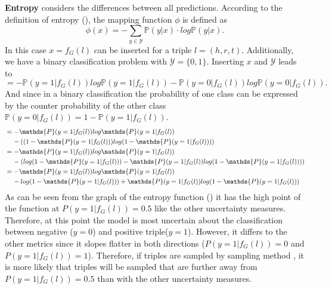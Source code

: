 \textbf{Entropy} 
considers the differences between all predictions.
According to the definition of entropy (), the mapping function $\phi$ is defined as
\begin{equation}
    \phi(x) = - \sum_{y \in \mathcal{Y}}{\mathds{P}(y | x) \cdot log \mathds{P}(y | x)}.
\end{equation}
In this case $x = f_G(l)$ can be inserted for a triple $l = (h,r,t)$.
Additionally, we have a binary classification problem with $\mathcal{Y} = \{0,1\}$.
Inserting $x$ and $\mathcal{Y}$ leads to
\begin{equation}
= - \mathds{P}(y = 1| f_G(l)) log \mathds{P}(y = 1 | f_G(l))
- \mathds{P}(y = 0| f_G(l)) log \mathds{P}(y = 0 | f_G(l)).
\end{equation}
And since in a binary classification the probability of one class can be expressed by the counter probability of the other class 
$\mathds{P}(y = 0| f_G(l)) = 1 - \mathds{P}(y = 1 | f_G(l))$.
\begin{align*} 
&= - \mathds{P}(y = 1| f_G(l)) log \mathds{P}(y = 1 | f_G(l))\\
  &\hspace{4mm}- ((1 - \mathds{P}(y = 1 | f_G(l))) log(1 - \mathds{P}(y = 1 | f_G(l)))) \\
&= - \mathds{P}(y = 1| f_G(l)) log \mathds{P}(y = 1 | f_G(l)) \\
   &\hspace{4mm}- (log(1 - \mathds{P}(y = 1 | f_G(l))) - \mathds{P}(y = 1 | f_G(l)) log(1 - \mathds{P}(y = 1 | f_G(l)))) \\
&= - \mathds{P}(y = 1| f_G(l)) log \mathds{P}(y = 1 | f_G(l)) \\
   &\hspace{4mm}- log(1 - \mathds{P}(y = 1 | f_G(l))) + \mathds{P}(y = 1 | f_G(l)) log(1 - \mathds{P}(y = 1 | f_G(l))) 
\end{align*}
As can be seen from the graph of the entropy function () it has the high point of the function at $P(y = 1 | f_G(l)) = 0.5$ like the other uncertainty measures.
Therefore, at this point the model is most uncertain about the classification between negative ($y = 0$) and positive triple($y = 1$).
However, it differs to the other metrics since it slopes flatter in both directions ($P(y = 1 | f_G(l)) = 0$ and $P(y = 1 | f_G(l)) = 1$).
Therefore, if triples are sampled by sampling method \ussoftmax, it is more likely that triples will be sampled that are further away from $P(y = 1 | f_G(l)) = 0.5$ than with the other uncertainty measures.

